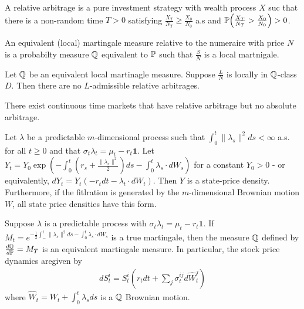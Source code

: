 \begin{defn}
  \label{sec:arbitr-theory-cont-10}
  A relative arbitrage is a pure investment strategy with wealth
  process $X$ suc that there is a non-random time $T > 0$ satisfying
  $\frac{X_{T}}{N_{T}} \geq \frac{X_{0}}{N_{0}}$ a.s and
  $\Prob{\frac{X_{T}}{N_{T}} > \frac{X_{0}}{N_{0}}} > 0$.
\end{defn}

\begin{defn}
  \label{sec:arbitr-theory-cont-11}
  An equivalent (local) martingale measure relative to the numeraire
  with price $N$ is a probabilty measure $\Q$ equivalent to $\Prob$ such
  that $\frac{S}{N}$ is a local martnigale.
\end{defn}

\begin{thm}
  \label{sec:arbitr-theory-cont-12}
  Let $\Q$ be an equivalent local martinagle measure.  Suppose
  $\frac{L}{N}$ is locally in $\Q$-class $D$.  Then there are no
  $L$-admissible relative arbitrages.
\end{thm}

\begin{thm}
  \label{sec:arbitr-theory-cont-13}
  There exist continuous time markets that have relative arbitrage but
  no absolute arbitrage.
\end{thm}

\begin{thm}
  \label{sec:arbitr-theory-cont-14}
  Let $\lambda$ be a predictable $m$-dimensional process such that
  $\int_{0}^{t} \| \lambda_{s} \|^{2}ds < \infty$ a.s. for all $t \geq
  0$ and that $\sigma_{t} \lambda_{t} = \mu_{t} - r_{t} \mathbf{1}$.
  Let $Y_{t} = Y_{0} \exp(-\int_{0}^{t} (r_{s} + \frac{\|
    \lambda_{s}\|^{2}}{2}) ds - \int_{0}^{t} \lambda_{s} \cdot
  dW_{s})$ for a constant $Y_{0} > 0$ - or equivalently, $dY_{t} =
  Y_{t}(-r_{t} dt - \lambda_{t} \cdot dW_{t})$.  Then $Y$ is a
  state-price density.  Furthermore, if the fitlration is generated by
  the $m$-dimensional Brownian motion $W$, all state price densities
  have this form.
\end{thm}

\begin{thm}
  \label{sec:arbitr-theory-cont-15}
  Suppose $\lambda$ is a predictable process with $\sigma_{t}
  \lambda_{t} = \mu_{t} - r_{t} \mathbf{1}$.  If $M_{t} =
  e^{-\frac{1}{2} \int_{-}^{t} \| \lambda_{s} \|^{2}ds - \int_{0}^{t}
    \lambda_{s} \cdot dW_{s}}$ is a true martingale, then the measure
  $\Q$ defined by $\frac{d\Q}{d\Prob} = M_{T}$ is an equivalent
  martingale measure.  In particular, the stock price dynamics
  aregiven by
  \begin{align}
    \label{eq:6}
    dS^{i}_{t} = S^{i}_{t}(r_{t} dt + \sum_{j} \sigma^{ij}_{t} d\hat W_{t}^{j})
  \end{align} where $\hat W_{t} = W_{t} + \int_{0}^{t} \lambda_{s} ds$
  is a $\Q$ Brownian motion.
\end{thm}

